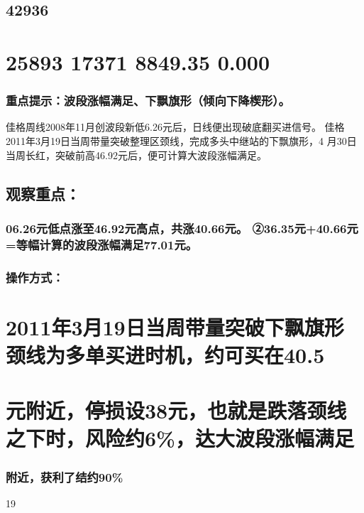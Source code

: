 \documentclass{article}
\begin{document}
\subsection{42936}

\section{25893 17371 8849.35 0.000}

\subsubsection{重点提示：波段涨幅满足、下飘旗形（倾向下降楔形）。}

佳格周线2008年11月创波段新低6.26元后，日线便出现破底翻买进信号。 佳格2011年3月19日当周带量突破整理区颈线，完成多头中继站的下飘旗形，4 月30日当周长红，突破前高46.92元后，便可计算大波段涨幅满足。

\subsection{观察重点：}

\subsubsection{06.26元低点涨至46.92元高点，共涨40.66元。 ②36.35元+40.66元=等幅计算的波段涨幅满足77.01元。}

\subsubsection{操作方式：}

\section{2011年3月19日当周带量突破下飘旗形颈线为多单买进时机，约可买在40.5}

\section{元附近，停损设38元，也就是跌落颈线之下时，风险约6\%，达大波段涨幅满足}

\subsubsection{附近，获利了结约90\%}

19

\clearpage
\end{document}

